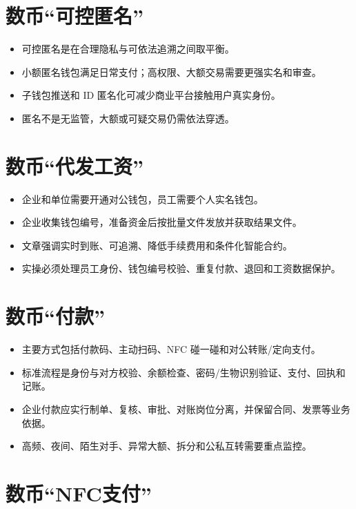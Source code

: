 \section{数币``可控匿名''}\label{ux6570ux5e01ux53efux63a7ux533fux540d}

\begin{itemize}
\tightlist
\item
  可控匿名是在合理隐私与可依法追溯之间取平衡。
\item
  小额匿名钱包满足日常支付；高权限、大额交易需要更强实名和审查。
\item
  子钱包推送和 ID 匿名化可减少商业平台接触用户真实身份。
\item
  匿名不是无监管，大额或可疑交易仍需依法穿透。
\end{itemize}

\section{数币``代发工资''}\label{ux6570ux5e01ux4ee3ux53d1ux5de5ux8d44}

\begin{itemize}
\tightlist
\item
  企业和单位需要开通对公钱包，员工需要个人实名钱包。
\item
  企业收集钱包编号，准备资金后按批量文件发放并获取结果文件。
\item
  文章强调实时到账、可追溯、降低手续费用和条件化智能合约。
\item
  实操必须处理员工身份、钱包编号校验、重复付款、退回和工资数据保护。
\end{itemize}

\section{数币``付款''}\label{ux6570ux5e01ux4ed8ux6b3e}

\begin{itemize}
\tightlist
\item
  主要方式包括付款码、主动扫码、NFC 碰一碰和对公转账/定向支付。
\item
  标准流程是身份与对方校验、余额检查、密码/生物识别验证、支付、回执和记账。
\item
  企业付款应实行制单、复核、审批、对账岗位分离，并保留合同、发票等业务依据。
\item
  高频、夜间、陌生对手、异常大额、拆分和公私互转需要重点监控。
\end{itemize}

\section{数币``NFC支付''}\label{ux6570ux5e01nfcux652fux4ed8}

